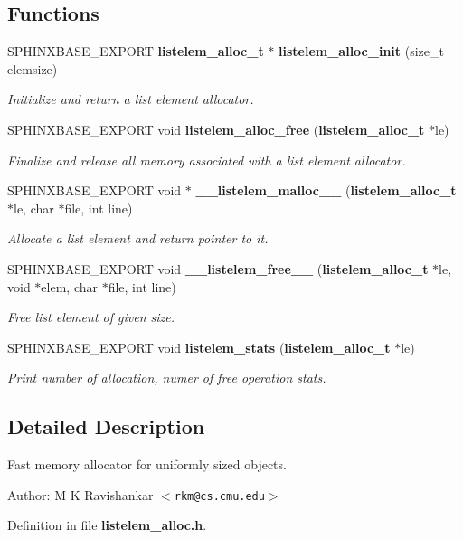 \subsection*{Functions}
\begin{CompactItemize}
\item 
SPHINXBASE\_\-EXPORT {\bf listelem\_\-alloc\_\-t} $\ast$ {\bf listelem\_\-alloc\_\-init} (size\_\-t elemsize)\label{listelem__alloc_8h_4b08b49eaa74cbe9a3c95170cee78de7}

\begin{CompactList}\small\item\em Initialize and return a list element allocator. \item\end{CompactList}\item 
SPHINXBASE\_\-EXPORT void {\bf listelem\_\-alloc\_\-free} ({\bf listelem\_\-alloc\_\-t} $\ast$le)\label{listelem__alloc_8h_94c02e93a0abaa2bd79636cbac6cced2}

\begin{CompactList}\small\item\em Finalize and release all memory associated with a list element allocator. \item\end{CompactList}\item 
SPHINXBASE\_\-EXPORT void $\ast$ {\bf \_\-\_\-listelem\_\-malloc\_\-\_\-} ({\bf listelem\_\-alloc\_\-t} $\ast$le, char $\ast$file, int line)\label{listelem__alloc_8h_04e5512f4dcedc2e84e58108bf61f1ff}

\begin{CompactList}\small\item\em Allocate a list element and return pointer to it. \item\end{CompactList}\item 
SPHINXBASE\_\-EXPORT void {\bf \_\-\_\-listelem\_\-free\_\-\_\-} ({\bf listelem\_\-alloc\_\-t} $\ast$le, void $\ast$elem, char $\ast$file, int line)\label{listelem__alloc_8h_b83a7a6fd086c14140ad2c8c4162709b}

\begin{CompactList}\small\item\em Free list element of given size. \item\end{CompactList}\item 
SPHINXBASE\_\-EXPORT void {\bf listelem\_\-stats} ({\bf listelem\_\-alloc\_\-t} $\ast$le)\label{listelem__alloc_8h_838d9361ba76a89a834a7ea6a185b57d}

\begin{CompactList}\small\item\em Print number of allocation, numer of free operation stats. \item\end{CompactList}\end{CompactItemize}


\subsection{Detailed Description}
Fast memory allocator for uniformly sized objects. 

\begin{Desc}
\item[Author:]M K Ravishankar $<${\tt rkm@cs.cmu.edu}$>$ \end{Desc}


Definition in file {\bf listelem\_\-alloc.h}.